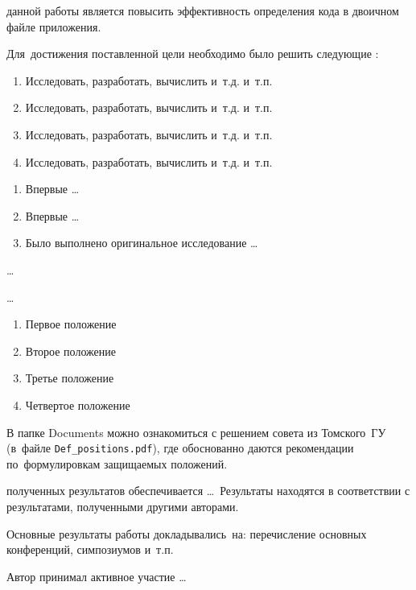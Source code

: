 {\aim} данной работы является %
повысить эффективность определения кода в двоичном файле приложения.

Для~достижения поставленной цели необходимо было решить следующие {\tasks}:
\begin{enumerate}[beginpenalty=10000] %
  \item Исследовать, разработать, вычислить и~т.\:д. и~т.\:п.
  \item Исследовать, разработать, вычислить и~т.\:д. и~т.\:п.
  \item Исследовать, разработать, вычислить и~т.\:д. и~т.\:п.
  \item Исследовать, разработать, вычислить и~т.\:д. и~т.\:п.
\end{enumerate}


{\novelty}
\begin{enumerate}[beginpenalty=10000] %
  \item Впервые \ldots
  \item Впервые \ldots
  \item Было выполнено оригинальное исследование \ldots
\end{enumerate}

{\influence} \ldots

{\methods} \ldots

{}
\begin{enumerate}[beginpenalty=10000] %
  \item Первое положение
  \item Второе положение
  \item Третье положение
  \item Четвертое положение
\end{enumerate}
В папке Documents можно ознакомиться с решением совета из Томского~ГУ
(в~файле \verb+Def_positions.pdf+), где обоснованно даются рекомендации
по~формулировкам защищаемых положений.

{\reliability} полученных результатов обеспечивается \ldots \ Результаты находятся в соответствии с результатами, полученными другими авторами.


{\probation}
Основные результаты работы докладывались~на:
перечисление основных конференций, симпозиумов и~т.\:п.

{\contribution} Автор принимал активное участие \ldots

